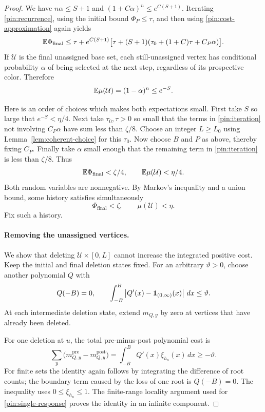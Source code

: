 \begin{proof}
We have $n\alpha\leq S+1$ and
$(1+C\alpha)^n\leq e^{C(S+1)}$.  Iterating
\eqref{pin:recurrence}, using the initial bound $\Phi_P\leq\tau$,
and then using \eqref{pin:cost-approximation} again yields
\begin{equation}\label{pin:iteration}
 \mathbb E\Phi_{\mathrm{final}}
 \leq\tau+e^{C(S+1)}
   \bigl[\tau+(S+1)(\tau_0+(1+C)\tau+C_P\alpha)\bigr].
\end{equation}
If $\mathcal U$ is the final unassigned base set, each still-unassigned
vertex has conditional probability $\alpha$ of being selected at the
next step, regardless of its prospective color.  Therefore
\begin{equation}\label{pin:unassigned-measure}
 \mathbb E\mu(\mathcal U)=(1-\alpha)^n\leq e^{-S}.
\end{equation}

Here is an order of choices which makes both expectations small.
First take $S$ so large that $e^{-S}<\eta/4$.  Next take
$\tau_0,\tau>0$ so small that the terms in
\eqref{pin:iteration} not involving $C_P\alpha$ have sum less than
$\zeta/8$.  Choose an integer $L\geq L_0$ using
Lemma~\ref{lem:coherent-choice} for this $\tau_0$.  Now choose $B$ and
$P$ as above, thereby fixing $C_P$.  Finally take $\alpha$ small
enough that the remaining term in \eqref{pin:iteration} is less than
$\zeta/8$.  Thus
\[
 \mathbb E\Phi_{\mathrm{final}}<\zeta/4,
 \qquad \mathbb E\mu(\mathcal U)<\eta/4.
\]
Both random variables are nonnegative.  By Markov's inequality and a
union bound, some history satisfies simultaneously
\begin{equation}\label{pin:chosen-history}
 \Phi_{\mathrm{final}}<\zeta,
 \qquad\mu(\mathcal U)<\eta.
\end{equation}
Fix such a history.

\paragraph{Removing the unassigned vertices.}
We show that deleting $\mathcal U\times[0,L]$ cannot increase the
integrated positive cost.  Keep the initial and final deletion states
fixed.  For an arbitrary $\vartheta>0$, choose another polynomial $Q$
with
\[
 Q(-B)=0,\qquad
 \int_{-B}^B\left|Q'(x)-\mathbf1_{(0,\infty)}(x)\right|\,dx
 \leq\vartheta.
\]
At each intermediate deletion state, extend $m_{Q,y}$ by zero at
vertices that have already been deleted.

For one deletion at $u$, the total pre-minus-post polynomial cost is
\begin{equation}\label{pin:single-deletion}
 \sum_y\bigl(m_{Q,y}^{\mathrm{pre}}-m_{Q,y}^{\mathrm{post}}\bigr)
     =\int_{-B}^B Q'(x)\xi_{h_u}(x)\,dx\geq-\vartheta.
\end{equation}
For finite sets the identity again follows by integrating the
difference of root counts; the boundary term caused by the loss of one
root is $Q(-B)=0$.  The inequality uses $0\leq\xi_{h_u}\leq1$.
The finite-range locality argument used for
\eqref{pin:single-response} proves the identity in an infinite
component.


\end{proof}
